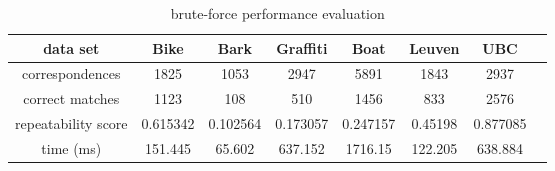 \begin{table}[H]
  \begin{tabular}{| c || c | c | c | c | c | c | c |}
      \hline
      data set & Bike & Bark & Graffiti & Boat & Leuven & UBC \\ \hline \hline
      correspondences & 1825 & 1053 & 2947 & 5891 & 1843 & 2937 \\ \hline
      correct matches & 1123 & 108 & 510 & 1456 & 833 & 2576 \\ \hline
      repeatability score & 0.615342 & 0.102564 & 0.173057 & 0.247157 & 0.45198 & 0.877085\\ \hline
      time (ms) & 151.445 & 65.602 & 637.152 & 1716.15 & 122.205 & 638.884 \\ \hline
  \end{tabular}
  \caption{brute-force performance evaluation} \label{tab:brute_force_matching_eval}
\end{table}

